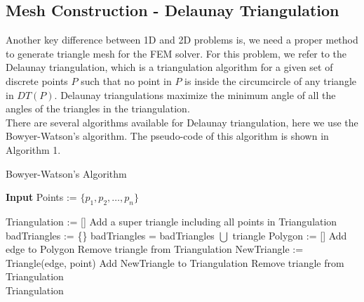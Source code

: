\documentclass[conference]{IEEEtran}
\begin{document}
    \subsection{Mesh Construction - Delaunay Triangulation}
    Another key difference between 1D and 2D problems is, we need a proper method to generate triangle mesh for the FEM solver.
    For this problem, we refer to the Delaunay triangulation\cite{b4}\cite{b5}\cite{b7}, which is a triangulation algorithm for a given 
    set of discrete points $P$ such that no point in $P$ is inside the circumcircle of any triangle in $DT(P)$. Delaunay triangulations 
    maximize the minimum angle of all the angles of the triangles in the triangulation\cite{b4}.\\
    There are several algorithms available for Delaunay triangulation, here we use the Bowyer-Watson's algorithm\cite{b6}. The 
    pseudo-code of this algorithm is shown in Algorithm 1.\\
    \begin{algorithm}[h]  
        \caption{Bowyer-Watson's Algorithm}  
        \textbf{Input} Points := $\{p_1, p_2,\ldots, p_n\}$
            \begin{algorithmic}[1]  
                \State Triangulation := []
                \State Add a super triangle including all points in Triangulation
                    \State badTriangles := \{\}
                            \State badTriangles = badTriangles $\bigcup$ triangle
                        \EndIf
                    \EndFor
                    \State Polygon := []
                                \State Add edge to Polygon
                            \EndIf
                        \EndFor
                    \EndFor
                        \State Remove triangle from Triangulation
                    \EndFor
                        \State NewTriangle := Triangle(edge, point)
                        \State Add NewTriangle to Triangulation
                    \EndFor
                            \State Remove triangle from Triangulation
                        \EndIf
                    \EndFor
                \EndFor\\
                \Return Triangulation
            \end{algorithmic}  
        \end{algorithm}
\end{document}
